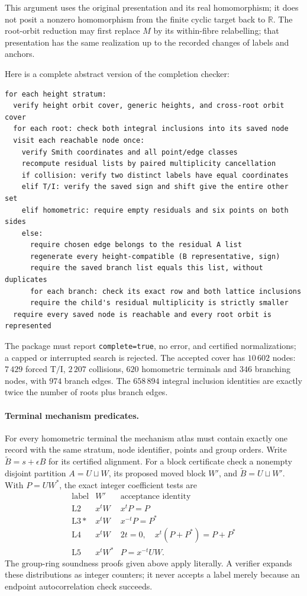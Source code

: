 \documentclass[11pt]{article}
\theoremstyle{remark}
\newcommand{\R}{\mathbb R}
\newcommand{\TI}{\mathrm{T/I}}
\newcommand{\code}[1]{\nolinkurl{#1}}
\begin{document}
This argument uses the original presentation and its real homomorphism;
it does not posit a nonzero homomorphism from the finite cyclic target
back to $\R$. The root-orbit reduction may first replace $M$ by its
within-fibre relabelling; that presentation has the same realization
up to the recorded changes of labels and anchors.

Here is a complete abstract version of the completion checker:
\begin{verbatim}
for each height stratum:
  verify height orbit cover, generic heights, and cross-root orbit cover
  for each root: check both integral inclusions into its saved node
  visit each reachable node once:
    verify Smith coordinates and all point/edge classes
    recompute residual lists by paired multiplicity cancellation
    if collision: verify two distinct labels have equal coordinates
    elif T/I: verify the saved sign and shift give the entire other set
    elif homometric: require empty residuals and six points on both sides
    else:
      require chosen edge belongs to the residual A list
      regenerate every height-compatible (B representative, sign)
      require the saved branch list equals this list, without duplicates
      for each branch: check its exact row and both lattice inclusions
      require the child's residual multiplicity is strictly smaller
  require every saved node is reachable and every root orbit is represented
\end{verbatim}
The package must report \code{complete=true}, no error, and certified
normalizations; a capped or interrupted search is rejected. The accepted
cover has $10\,602$ nodes: $7\,429$ forced $\TI$, $2\,207$ collisions,
$620$ homometric terminals and $346$ branching nodes, with $974$ branch
edges. The $658\,894$ integral inclusion identities are exactly twice
the number of roots plus branch edges.

\paragraph{Terminal mechanism predicates.}
For every homometric terminal the mechanism atlas must contain exactly
one record with the same stratum, node identifier, points and group orders.
Write $\widetilde B=s+\epsilon B$ for its certified alignment. For a
block certificate check a nonempty disjoint partition $A=U\sqcup W$,
its proposed moved block $W'$, and $\widetilde B=U\sqcup W'$.
With $P=UW^*$, the exact integer coefficient tests are
\[
\begin{array}{c|c|c}
\text{label}&W'&\text{acceptance identity}\\\hline
\mathrm{L2}&x^tW&x^tP=P\\
\mathrm{L3*}&x^tW&x^{-t}P=P^*\\
\mathrm{L4}&x^tW&2t=0,\quad x^t(P+P^*)=P+P^*\\
\mathrm{L5}&x^tW^*&P=x^{-t}UW .
\end{array}
\]
The group-ring soundness proofs given above apply literally. A verifier
expands these distributions as integer counters; it never accepts a label
merely because an endpoint autocorrelation check succeeds.
\end{document}
